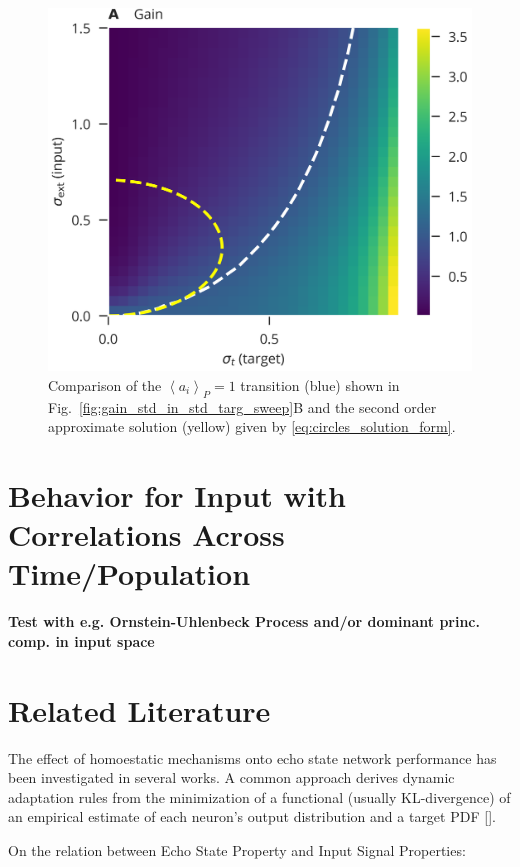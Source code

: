 \documentclass[10pt,a4paper]{article}
\newcommand{\avgp}[1]{\left< #1 \right>_P}
\begin{document}
\begin{figure}
	\centering
	\includegraphics{../plots/crit_transition_2nd_order_approx.png}
	\caption{Comparison of the $\avgp{a_i} = 1$ transition (blue) shown in Fig.~\ref{fig:gain_std_in_std_targ_sweep}B and the second order approximate solution (yellow) given by \eqref{eq:circles_solution_form}. }
	\label{fig:crit_transition_2nd_order_approx}
\end{figure}

\section{Behavior for Input with Correlations Across Time/Population}

{\bf Test with e.g. Ornstein-Uhlenbeck Process and/or dominant princ. comp. in input space}

\section{Related Literature}

The effect of homoestatic mechanisms onto echo state network performance has been investigated in several works. A common approach derives dynamic adaptation rules from the minimization of a functional (usually KL-divergence) of an empirical estimate of each neuron's output distribution and a target PDF [\cite{Triesch_2007, Schrauwen_2008, Boedecker_2009}].

On the relation between Echo State Property and Input Signal Properties: \cite{Manjunath_2013}



\end{document}
